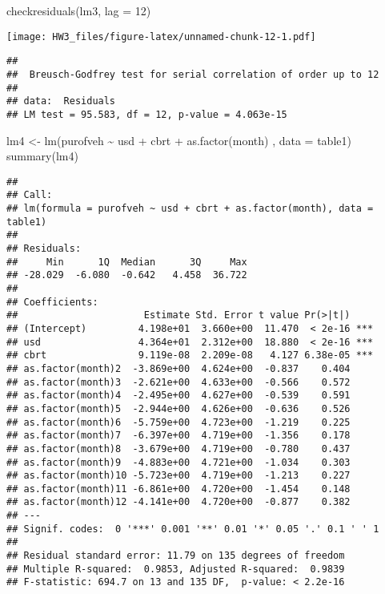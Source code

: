 \documentclass[
]{article}
\newenvironment{Shaded}{\begin{snugshade}}{\end{snugshade}}
\newcommand{\AttributeTok}[1]{\textcolor[rgb]{0.77,0.63,0.00}{#1}}
\newcommand{\DecValTok}[1]{\textcolor[rgb]{0.00,0.00,0.81}{#1}}
\newcommand{\FunctionTok}[1]{\textcolor[rgb]{0.00,0.00,0.00}{#1}}
\newcommand{\NormalTok}[1]{#1}
\newcommand{\OtherTok}[1]{\textcolor[rgb]{0.56,0.35,0.01}{#1}}
\newcommand{\SpecialCharTok}[1]{\textcolor[rgb]{0.00,0.00,0.00}{#1}}
\begin{document}
\begin{Shaded}
\begin{Highlighting}[]
\FunctionTok{checkresiduals}\NormalTok{(lm3, }\AttributeTok{lag =} \DecValTok{12}\NormalTok{)}
\end{Highlighting}
\end{Shaded}

\texttt{[image: HW3\_files/figure-latex/unnamed-chunk-12-1.pdf]}

\begin{verbatim}
## 
##  Breusch-Godfrey test for serial correlation of order up to 12
## 
## data:  Residuals
## LM test = 95.583, df = 12, p-value = 4.063e-15
\end{verbatim}

\begin{Shaded}
\begin{Highlighting}[]
\NormalTok{lm4 }\OtherTok{\textless{}{-}} \FunctionTok{lm}\NormalTok{(purofveh }\SpecialCharTok{\textasciitilde{}}\NormalTok{ usd }\SpecialCharTok{+}\NormalTok{ cbrt }\SpecialCharTok{+} \FunctionTok{as.factor}\NormalTok{(month) , }\AttributeTok{data =}\NormalTok{ table1)}
\FunctionTok{summary}\NormalTok{(lm4)}
\end{Highlighting}
\end{Shaded}

\begin{verbatim}
## 
## Call:
## lm(formula = purofveh ~ usd + cbrt + as.factor(month), data = table1)
## 
## Residuals:
##     Min      1Q  Median      3Q     Max 
## -28.029  -6.080  -0.642   4.458  36.722 
## 
## Coefficients:
##                      Estimate Std. Error t value Pr(>|t|)    
## (Intercept)         4.198e+01  3.660e+00  11.470  < 2e-16 ***
## usd                 4.364e+01  2.312e+00  18.880  < 2e-16 ***
## cbrt                9.119e-08  2.209e-08   4.127 6.38e-05 ***
## as.factor(month)2  -3.869e+00  4.624e+00  -0.837    0.404    
## as.factor(month)3  -2.621e+00  4.633e+00  -0.566    0.572    
## as.factor(month)4  -2.495e+00  4.627e+00  -0.539    0.591    
## as.factor(month)5  -2.944e+00  4.626e+00  -0.636    0.526    
## as.factor(month)6  -5.759e+00  4.723e+00  -1.219    0.225    
## as.factor(month)7  -6.397e+00  4.719e+00  -1.356    0.178    
## as.factor(month)8  -3.679e+00  4.719e+00  -0.780    0.437    
## as.factor(month)9  -4.883e+00  4.721e+00  -1.034    0.303    
## as.factor(month)10 -5.723e+00  4.719e+00  -1.213    0.227    
## as.factor(month)11 -6.861e+00  4.720e+00  -1.454    0.148    
## as.factor(month)12 -4.141e+00  4.720e+00  -0.877    0.382    
## ---
## Signif. codes:  0 '***' 0.001 '**' 0.01 '*' 0.05 '.' 0.1 ' ' 1
## 
## Residual standard error: 11.79 on 135 degrees of freedom
## Multiple R-squared:  0.9853, Adjusted R-squared:  0.9839 
## F-statistic: 694.7 on 13 and 135 DF,  p-value: < 2.2e-16
\end{verbatim}
\end{document}
